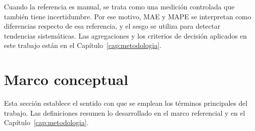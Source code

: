 Cuando la referencia es manual, se trata como una medición controlada que también tiene incertidumbre. Por ese motivo, MAE y MAPE se interpretan como diferencias respecto de esa referencia, y el sesgo se utiliza para detectar tendencias sistemáticas. Las agregaciones y los criterios de decisión aplicados en este trabajo están en el Capítulo~\ref{cap:metodologia}.

\section{Marco conceptual}
\label{sec:conceptual}

Esta sección establece el sentido con que se emplean los términos principales del trabajo. Las definiciones resumen lo desarrollado en el marco referencial y en el Capítulo~\ref{cap:metodologia}.

